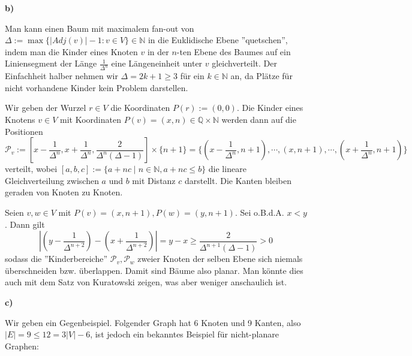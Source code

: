 \documentclass[a4paper,graphics,11pt]{article}
\begin{document}
\textbf{b)}

Man kann einen Baum mit maximalem fan-out von $\Delta := \max\{|Adj(v)|-1 : v \in V\} \in \mathbb{N}$
in die Euklidische Ebene ''quetschen'', indem man die Kinder eines Knoten $v$ in der $n$-ten Ebene des Baumes
auf ein Liniensegment der Länge $\frac{1}{\Delta^n}$ eine Längeneinheit unter $v$ gleichverteilt.
Der Einfachheit halber nehmen wir $\Delta = 2k+1 \geq 3$ für ein $k\in \mathbb{N}$ an, da Plätze für nicht vorhandene
Kinder kein Problem darstellen.

Wir geben der Wurzel $r \in V$ die Koordinaten $P(r) := (0,0)$.
Die Kinder eines Knotens $v \in V$ mit Koordinaten $P(v) = (x,n) \in \mathbb{Q}\times \mathbb{N}$ werden dann auf
die Positionen
$$
    \mathcal{P}_v := [x-\frac{1}{\Delta^n}, x+\frac{1}{\Delta^n}, \frac{2}{\Delta^n(\Delta - 1)}] \times \{n+1\}
    = \{(x-\frac{1}{\Delta^n}, n+1), \cdots, (x,n+1), \cdots, (x+\frac{1}{\Delta^n}, n+1)\}
$$
verteilt, wobei $[a,b,c] := \{a+nc \mid n \in \mathbb{N}, a+nc \leq b\}$ die lineare Gleichverteilung zwischen $a$ und $b$ mit
Distanz $c$ darstellt.
Die Kanten bleiben geraden von Knoten zu Knoten.

Seien $v,w \in V$ mit $P(v) = (x,n+1), P(w) = (y,n+1)$. Sei o.B.d.A. $x < y$. Dann gilt
$$
    |(y-\frac{1}{\Delta^{n+2}}) - (x+\frac{1}{\Delta^{n+2}})| = y-x \geq \frac{2}{\Delta^{n+1}(\Delta -1)} > 0
$$
sodass die ''Kinderbereiche'' $\mathcal{P}_v, \mathcal{P}_w$ zweier Knoten der selben Ebene sich niemals überschneiden bzw. überlappen.
Damit sind Bäume also planar. Man könnte dies auch mit dem Satz von Kuratowski zeigen, was aber weniger anschaulich ist.

\textbf{c)}

Wir geben ein Gegenbeispiel. Folgender Graph hat 6 Knoten und 9 Kanten, also $|E| = 9 \leq 12 = 3|V|-6$, ist jedoch ein
bekanntes Beispiel für nicht-planare Graphen:

\begin{center}
\end{center}
\end{document}
